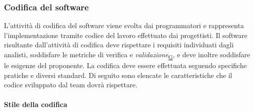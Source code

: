 \documentclass[a4paper,12pt]{article}
\begin{document}
{{            
        \subsubsection{Codifica del software}{
            L'attività di codifica del software viene svolta dai programmatori e rappresenta l'implementazione tramite codice del lavoro effettuato dai progettisti. Il software risultante dall'attività di codifica deve rispettare i requisiti individuati dagli analisti, soddisfare le metriche di verifica e \textit{validazione}\textsubscript{\href{https://atlasteam9.github.io/Atlas/glossario.html\#Validazione}{G}}, e deve inoltre soddisfare le esigenze del proponente.
            \newline
            La codifica deve essere effettuata seguendo specifiche pratiche e diversi standard. Di seguito sono elencate le caratteristiche che il codice sviluppato dal team dovrà rispettare.

            \paragraph{Stile della codifica}\hfill{}}}}
\end{document}

